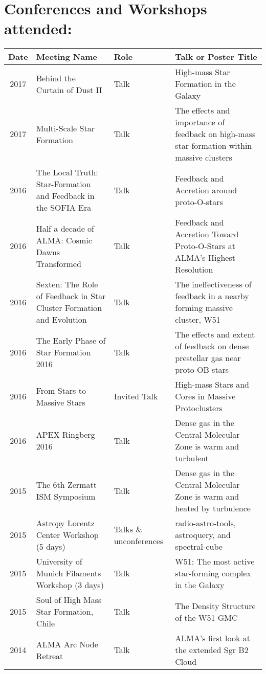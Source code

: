 \setlength{\extrarowheight}{4pt}
\section*{Conferences and Workshops attended: }
\vspace{-12pt}
\begin{tabular}{cp{1.8in}p{1.5cm}p{3.0in}}
    Date & Meeting Name & Role & Talk or Poster Title \\
                \hline
    2017 &      Behind the Curtain of Dust II & Talk & High-mass Star Formation in the Galaxy \\
    2017 &      Multi-Scale Star Formation & Talk & The effects and importance of feedback on high-mass star formation within massive clusters \\
    2016 &      The Local Truth: Star-Formation and Feedback in the SOFIA Era & Talk & Feedback and Accretion around proto-O-stars \\
    2016 &      Half a decade of ALMA: Cosmic Dawns Transformed & Talk & Feedback and Accretion Toward Proto-O-Stars at ALMA's Highest Resolution \\
    2016 &      Sexten: The Role of Feedback in Star Cluster Formation and Evolution  & Talk & The ineffectiveness of feedback in a nearby forming massive cluster, W51 \\
    2016 &      The Early Phase of Star Formation 2016 & Talk & The effects and extent of feedback on dense prestellar gas near proto-OB stars \\
    2016 &      From Stars to Massive Stars & Invited Talk & High-mass Stars and Cores in Massive Protoclusters \\
    2016 &      APEX Ringberg 2016 & Talk & Dense gas in the Central Molecular Zone is warm and turbulent \\
    2015 &      The 6th Zermatt ISM Symposium & Talk & Dense gas in the Central Molecular Zone is warm and heated by turbulence \\
    2015 &      Astropy Lorentz Center Workshop (5 days) & Talks \& unconferences & radio-astro-tools, astroquery, and spectral-cube \\ 
    2015 &      University of Munich Filaments Workshop (3 days) & Talk & W51: The most active star-forming complex in the Galaxy \\
    2015 &      Soul of High Mass Star Formation, Chile & Talk & The Density Structure of the W51 GMC \\
    2014 &      ALMA Arc Node Retreat  & Talk & ALMA's first look at the extended Sgr B2 Cloud \\

\end{tabular}
